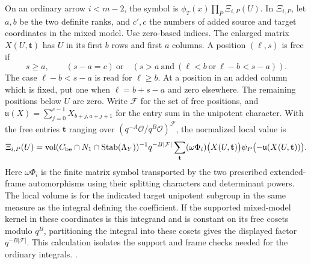 On an ordinary arrow \(i<m-2\), the symbol is
\(\phi_T(x)\prod_P\Xi_{i,P}(U)\).
In \(\Xi_{i,P}\), let \(a,b\) be the two definite ranks,
and \(c',c\) the numbers of added source and target coordinates
in the mixed model. Use zero-based indices.
The enlarged matrix \(X(U,\mathbf t)\) has \(U\) in its first
\(b\) rows and first \(a\) columns. A position \((\ell,s)\)
is free if
\[
 s\ge a,\qquad
 (s-a=c)\ \text{or}\quad
 (s>a\ \text{and}\ (\ell<b\ \text{or}\ \ell-b<s-a)).
\]
The case \(\ell-b<s-a\) is read for \(\ell\ge b\).
At a position in an added column which is fixed, put
one when \(\ell=b+s-a\) and zero elsewhere. The remaining
positions below \(U\) are zero. Write \(\mathcal F\) for the
set of free positions, and
\(\mathfrak u(X)=\sum_{j=0}^{c-1}X_{b+j,a+j+1}\) for
the entry sum in the unipotent character. With the free entries
\(\mathbf t\) ranging over \((q^{-A}\mathcal O/q^B\mathcal O)^{\mathcal F}\),
the normalized local value is
\[
 \Xi_{i,P}(U)=
 \operatorname{vol}(C_{\rm be}\cap N_1
                  \cap\operatorname{Stab}(\Lambda_Y))^{-1}
 q^{-B|\mathcal F|}
 \sum_{\mathbf t}(\omega\Phi_i)\bigl(X(U,\mathbf t)\bigr)
                \psi_P\bigl(-\mathfrak u(X(U,\mathbf t))\bigr).
\]
Here \(\omega\Phi_i\) is the finite matrix symbol transported
by the two prescribed extended-frame automorphisms using their
splitting characters and determinant powers. The local volume
is for the indicated target unipotent subgroup in the
same measure as the integral defining the coefficient.
If the supported mixed-model kernel in these coordinates is
this integrand and is constant on its free cosets modulo \(q^B\),
partitioning the integral into these cosets gives the displayed
factor \(q^{-B|\mathcal F|}\). This calculation isolates the
support and frame checks needed for the ordinary integrals.
.

